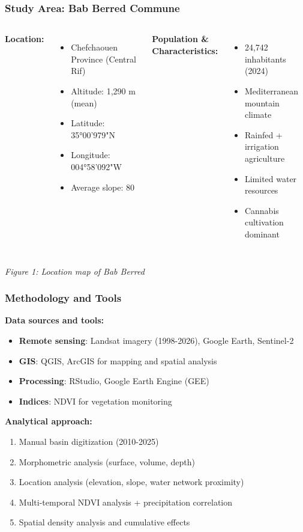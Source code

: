 \documentclass{beamer}
\begin{document}
\begin{frame}
\frametitle{Study Area: Bab Berred Commune}
\begin{columns}[T]
  \textbf{Location:}
  \begin{itemize}
    \item Chefchaouen Province (Central Rif)
    \item Altitude: 1,290 m (mean)
    \item Latitude: 35°00'979"N
    \item Longitude: 004°58'092"W
    \item Average slope: 80%
  \end{itemize}

  \textbf{Population \& Characteristics:}
  \begin{itemize}
    \item 24,742 inhabitants (2024)
    \item Mediterranean mountain climate
    \item Rainfed + irrigation agriculture
    \item Limited water resources
    \item Cannabis cultivation dominant
  \end{itemize}
\end{columns}

\begin{center}
  \small{\textit{Figure 1: Location map of Bab Berred}}
\end{center}
\end{frame}

\begin{frame}
\frametitle{Methodology and Tools}
\textbf{Data sources and tools:}
\begin{itemize}
  \item \textbf{Remote sensing}: Landsat imagery (1998-2026), Google Earth, Sentinel-2
  \item \textbf{GIS}: QGIS, ArcGIS for mapping and spatial analysis
  \item \textbf{Processing}: RStudio, Google Earth Engine (GEE)
  \item \textbf{Indices}: NDVI for vegetation monitoring
\end{itemize}

\textbf{Analytical approach:}
\begin{enumerate}
  \item Manual basin digitization (2010-2025)
  \item Morphometric analysis (surface, volume, depth)
  \item Location analysis (elevation, slope, water network proximity)
  \item Multi-temporal NDVI analysis + precipitation correlation
  \item Spatial density analysis and cumulative effects
\end{enumerate}
\end{frame}
\end{document}
